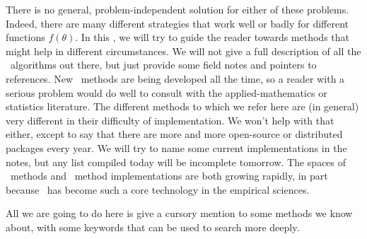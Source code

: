 \documentclass[12pt,twoside,pdftex]{article}
\newcommand{\MCMC}{\acronym{MCMC}}
\newcommand{\pars}{\theta}
\begin{document}
There is no general, problem-independent solution for either of these
problems.
Indeed, there are many different strategies that work well or badly
for different functions $f(\pars)$.
In this \sectionname, we will try to guide the reader towards methods
that might help in different circumstances.
We will not give a full description of all the \MCMC\ algorithms out
there, but just provide some field notes and pointers to references.
New \MCMC\ methods are being developed all the time, so a reader with a
serious problem would do well to consult with the applied-mathematics
or statistics literature.
The different methods to which we refer here are (in general) very
different in their difficulty of implementation.
We won't help with that either, except to say that there are more and
more open-source or distributed packages every year.
We will try to name some current implementations in the notes, but any
list compiled today will be incomplete tomorrow.
The spaces of \MCMC\ methods and \MCMC\ method implementations are both
growing rapidly, in part because \MCMC\ has become such a core
technology in the empirical sciences.

All we are going to do here is give a cursory mention to some methods
we know about, with some keywords that can be used to search more
deeply.

%
%

\end{document}
